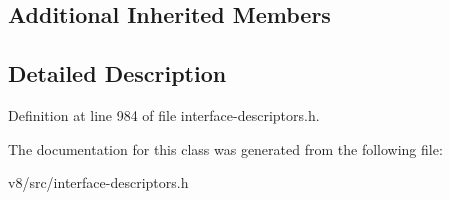 \subsection*{Additional Inherited Members}


\subsection{Detailed Description}


Definition at line 984 of file interface-\/descriptors.\+h.



The documentation for this class was generated from the following file\+:\begin{DoxyCompactItemize}
\item 
v8/src/interface-\/descriptors.\+h\end{DoxyCompactItemize}
